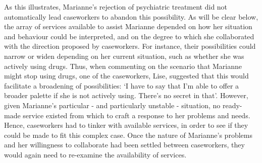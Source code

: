As this illustrates, Marianne’s rejection of psychiatric treatment did not automatically lead caseworkers to abandon this possibility. As will be clear below, the array of services available to assist Marianne depended on how her situation and behaviour could be interpreted, and on the degree to which she collaborated with the direction proposed by caseworkers. For instance, their possibilities could narrow or widen depending on her current situation, such as whether she was actively using drugs. Thus, when commenting on the scenario that Marianne might stop using drugs, one of the caseworkers, Lise, suggested that this would facilitate a broadening of possibilities: ‘I have to say that I’m able to offer a broader palette if she is not actively using. There’s no secret in that’. However, given Marianne’s particular - and particularly unstable - situation, no ready-made service existed from which to craft a response to her problems and needs. Hence, caseworkers had to tinker with available services, in order to see if they could be made to fit this complex case. Once the nature of Marianne’s problems and her willingness to collaborate had been settled between caseworkers, they would again need to re-examine the availability of services.

